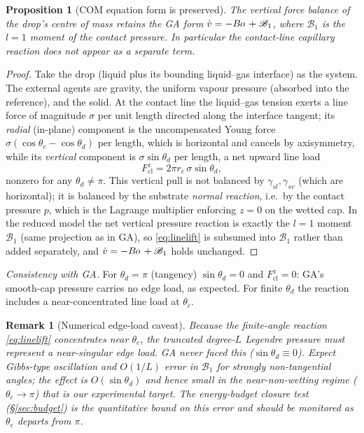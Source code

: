 \documentclass{jfm}
\newcommand{\be}{\begin{equation}}
\newcommand{\ee}{\end{equation}}
\newcommand{\Bo}{B\kern-0.05em o\,}
\newtheorem{proposition}{Proposition}
\newtheorem{remark}{Remark}
\begin{document}
\begin{proposition}[COM equation form is preserved]\label{prop:noforce}
The vertical force balance of the drop's centre of mass retains the GA form
$\dot v=-\Bo+\mathscr B_1$, where $\mathscr B_1$ is the $l=1$ moment of the contact
pressure. In particular the contact-line capillary reaction does not appear as a
\emph{separate} term.
\end{proposition}
\begin{proof}
Take the drop (liquid plus its bounding liquid--gas interface) as the system. The
external agents are gravity, the uniform vapour pressure (absorbed into the reference),
and the solid. At the contact line the liquid--gas tension exerts a line force of
magnitude $\sigma$ per unit length directed along the interface tangent; its
\emph{radial} (in-plane) component is the uncompensated Young force
$\sigma(\cos\theta_e-\cos\theta_d)$ per length, which is horizontal and cancels by
axisymmetry, while its \emph{vertical} component is $\sigma\sin\theta_d$ per length, a
net upward line load
\be\label{eq:linelift}
F_{\text{cl}}^{z}=2\pi r_c\,\sigma\sin\theta_d,
\ee
nonzero for any $\theta_d\neq\pi$. This vertical pull is not balanced by
$\gamma_{sl},\gamma_{sv}$ (which are horizontal); it is balanced by the substrate
\emph{normal reaction}, i.e.\ by the contact pressure $p$, which is the Lagrange
multiplier enforcing $z=0$ on the wetted cap. In the reduced model the net vertical
pressure reaction is exactly the $l=1$ moment $\mathscr B_1$ (same projection as in GA),
so \eqref{eq:linelift} is subsumed into $\mathscr B_1$ rather than added separately, and
$\dot v=-\Bo+\mathscr B_1$ holds unchanged.
\end{proof}

\noindent\emph{Consistency with GA.} For $\theta_d=\pi$ (tangency) $\sin\theta_d=0$ and
$F_{\text{cl}}^z=0$: GA's smooth-cap pressure carries no edge load, as expected. For
finite $\theta_d$ the reaction includes a near-concentrated line load at $\theta_c$.

\begin{remark}[Numerical edge-load caveat]\label{rem:edgeload}
Because the finite-angle reaction \eqref{eq:linelift} concentrates near $\theta_c$, the
truncated degree-$L$ Legendre pressure must represent a near-singular edge load. GA never
faced this ($\sin\theta_d\equiv0$). Expect Gibbs-type oscillation and $O(1/L)$ error in
$\mathscr B_1$ for strongly non-tangential angles; the effect is $O(\sin\theta_d)$ and
hence \emph{small in the near-non-wetting regime} ($\theta_e\to\pi$) that is our
experimental target. The energy-budget closure test (\S\ref{sec:budget}) is the
quantitative bound on this error and should be monitored as $\theta_e$ departs from
$\pi$.
\end{remark}
\end{document}
